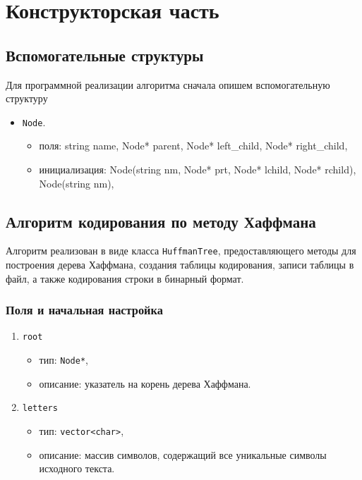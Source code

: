 \chapter{Конструкторская часть}

\section{Вспомогательные структуры} 
Для программной реализации алгоритма сначала опишем вспомогательную структуру
\begin{itemize}
\item \texttt{Node}.
	\begin{itemize}
		\item поля: string name, Node* parent,	Node* left\_child, Node* right\_child,
		\item инициализация: Node(string nm, Node* prt, Node* lchild, Node* rchild), Node(str\-ing nm),
	\end{itemize}
\end{itemize}

\section{Алгоритм кодирования по методу Хаффмана}
Алгоритм реализован в виде класса \texttt{HuffmanTree}, предоставляющего методы для построения дерева Хаффмана, создания таблицы кодирования, записи таблицы в файл, а также кодирования строки в бинарный формат.

\subsection*{Поля и начальная настройка}
\begin{enumerate}
	\item \texttt{root}
	\begin{itemize}
		\item тип: \texttt{Node*},
		\item описание: указатель на корень дерева Хаффмана.
	\end{itemize}
	\item \texttt{letters}
	\begin{itemize}
		\item тип: \texttt{vector<char>},
		\item описание: массив символов, содержащий все уникальные символы исходного текста.
	\end{itemize}
\end{enumerate}

